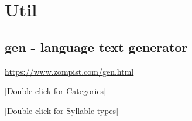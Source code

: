 \section*{Util}

\subsection{gen - language text generator}
\url{https://www.zompist.com/gen.html}

{[}Double click for Categories{]}
\iffalse
C=šždkgszpbtčjywcżmnñ
V=iueoa
N=nñm
S=šs
P=bdg
\fi

{[}Double click for Syllable types{]}
\iffalse
CV
SPV
CVN
SPVN
\fi
